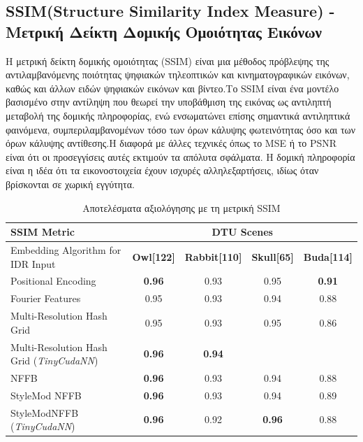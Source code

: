\subsection{SSIM(Structure Similarity Index Measure) - Μετρική Δείκτη Δομικής Ομοιότητας Εικόνων}
Η μετρική δείκτη δομικής ομοιότητας (SSIM) είναι μια μέθοδος πρόβλεψης της αντιλαμβανόμενης ποιότητας ψηφιακών τηλεοπτικών και κινηματογραφικών εικόνων, καθώς και άλλων ειδών ψηφιακών εικόνων και βίντεο.Το SSIM είναι ένα μοντέλο βασισμένο στην αντίληψη που θεωρεί την υποβάθμιση της εικόνας ως αντιληπτή μεταβολή της δομικής πληροφορίας, ενώ ενσωματώνει επίσης σημαντικά αντιληπτικά φαινόμενα, συμπεριλαμβανομένων τόσο των όρων κάλυψης φωτεινότητας όσο και των όρων κάλυψης αντίθεσης.Η διαφορά με άλλες τεχνικές όπως το MSE ή το PSNR είναι ότι οι προσεγγίσεις αυτές εκτιμούν τα απόλυτα σφάλματα. Η δομική πληροφορία είναι η ιδέα ότι τα εικονοστοιχεία έχουν ισχυρές αλληλεξαρτήσεις, ιδίως όταν βρίσκονται σε χωρική εγγύτητα.
\begin{table}[H]
\centering
\begin{tabular}{|l|c|c|c|c|}
\hline
\textbf{SSIM Metric} & \multicolumn{4}{c|}{\textbf{DTU Scenes}} \\
\hline
Embedding Algorithm for IDR Input & \textbf{Owl[122]} & \textbf{Rabbit[110]} & \textbf{Skull[65]} & \textbf{Buda[114]} \\
\hline
Positional Encoding & \textbf{0.96} & 0.93 & 0.95 & \textbf{0.91} \\
\hline
Fourier Features & 0.95 & 0.93 & 0.94 & 0.88 \\
\hline
Multi-Resolution Hash Grid & 0.95 & 0.93 & 0.95 & 0.86 \\
\hline
Multi-Resolution Hash Grid (\textit{TinyCudaNN}) & \textbf{0.96} & \textbf{0.94} & & \\
\hline
NFFB & \textbf{0.96} & 0.93 & 0.94 & 0.88 \\
\hline
StyleMod NFFB & \textbf{0.96} & 0.93 & 0.94 & 0.89 \\
\hline
StyleModNFFB (\textit{TinyCudaNN}) & \textbf{0.96} & 0.92 & \textbf{0.96} & 0.88 \\
\hline
\end{tabular}
\caption{Αποτελέσματα αξιολόγησης με τη μετρική SSIM}
\end{table}



